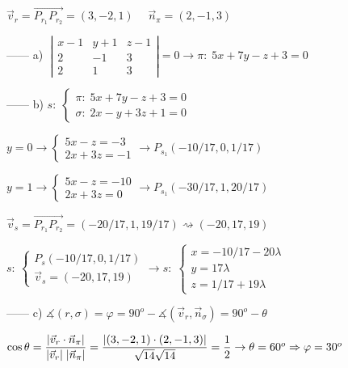 \begin{proofw}
\noindent $\vec v_r=\overrightarrow{P_{r_1}P_{r_2}}=(3,-2,1)\; \quad \vec n_{\pi}=(2,-1,3)$

\noindent ------ a) $\;\left| \begin{matrix} x-1&y+1&z-1\\2&-1&3\\2&1&3 \end{matrix}\right|=0 \to \pi:\; 5x+7y-z+3=0$

\noindent ------ b) $s:\; \begin{cases} \pi:\; 5x+7y-z+3=0\\ \sigma:\; 2x-y+3z+1=0 \end{cases}$

\noindent $y=0 \to \begin{cases} 5x-z=-3 \\ 2x+3z=-1 \end{cases} \to P_{s_1}( -10/17,0,1/17 )$ 

\noindent $y=1 \to \begin{cases} 5x-z=-10\\ 2x+3z=0 \end{cases} \to P_{s_1}( -30/17,1,20/17 )$ 

\noindent $\vec v_s=\overrightarrow{P_{r_1}P_{r_2}}=(-20/17, 1, 19/17) \rightsquigarrow  (-20,17,19)$

\noindent $s:\: \begin{cases} P_s(-10/17,0,1/17) \\ \vec v_s=(-20,17,19) \end{cases} \to s:\; \begin{cases} x=-10/17-20\lambda \\y=17\lambda \\ z=1/17+19\lambda \end{cases}$

\noindent ------ c) $\measuredangle(r,\sigma)=\varphi=90^o-\measuredangle(\vec v_r,\vec n_{\sigma})=90^o-\theta$

\noindent $\cos \theta=\dfrac {\abs{\vec v_r \cdot \vec n_{\pi}}}{ |\vec v_r|\;|\vec n_{\pi}|}=\dfrac {|(3,-2,1)\cdot (2,-1,3)|}{\sqrt{14} \sqrt{14}}=\dfrac 1 2 \to \theta = 60^o \Rightarrow \varphi =30^o$

\end{proofw}

